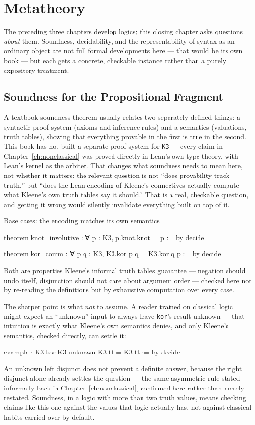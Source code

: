 \chapter{Metatheory}
\label{ch:metatheory}

The preceding three chapters develop logics; this closing chapter
asks questions \emph{about} them. Soundness, decidability, and the
representability of syntax as an ordinary object are not full
formal developments here — that would be its own book — but each
gets a concrete, checkable instance rather than a purely expository
treatment.

\section{Soundness for the Propositional Fragment}

A textbook soundness theorem usually relates two separately defined
things: a syntactic proof system (axioms and inference rules) and a
semantics (valuations, truth tables), showing that everything
provable in the first is true in the second. This book has not built
a separate proof system for \texttt{K3} — every claim in
Chapter~\ref{ch:nonclassical} was proved directly in Lean's own type
theory, with Lean's kernel as the arbiter. That changes what
soundness needs to mean here, not whether it matters: the relevant
question is not ``does provability track truth,'' but ``does the
Lean encoding of Kleene's connectives actually compute what
Kleene's own truth tables say it should.'' That is a real,
checkable question, and getting it wrong would silently invalidate
everything built on top of it.

\begin{experiment}{Base cases: the encoding matches its own semantics}
\begin{lean}
theorem knot_involutive : ∀ p : K3, p.knot.knot = p := by decide

theorem kor_comm : ∀ p q : K3, K3.kor p q = K3.kor q p := by decide
\end{lean}
Both are properties Kleene's informal truth tables guarantee — 
negation should undo itself, disjunction should not care about
argument order — checked here not by re-reading the definitions but
by exhaustive computation over every case.
\end{experiment}

The sharper point is what \emph{not} to assume. A reader trained on
classical logic might expect an ``unknown'' input to always leave
\texttt{kor}'s result unknown — that intuition is exactly what
Kleene's own semantics denies, and only Kleene's semantics, checked
directly, can settle it:
\begin{lean}
example : K3.kor K3.unknown K3.tt = K3.tt := by decide
\end{lean}
An unknown left disjunct does not prevent a definite answer, because
the right disjunct alone already settles the question — the same
asymmetric rule stated informally back in
Chapter~\ref{ch:nonclassical}, confirmed here rather than merely
restated. Soundness, in a logic with more than two truth values,
means checking claims like this one against the values that logic
actually has, not against classical habits carried over by default.

